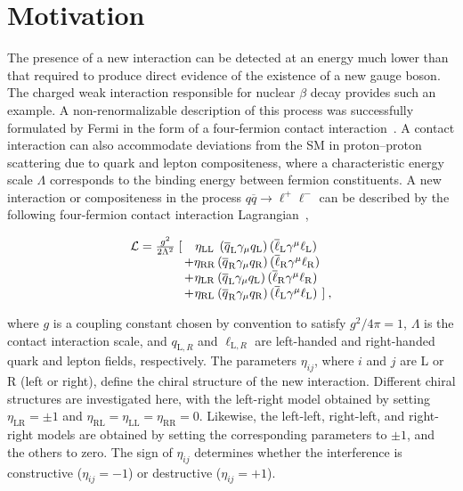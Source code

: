 \section{Motivation}\label{sec:ciMotivation}

The presence of a new interaction can be detected at an energy much lower than that required to produce direct evidence of the existence of a new gauge boson. The charged weak interaction responsible for nuclear $\beta$ decay provides such an example. A non-renormalizable description of this process was successfully formulated by Fermi in the form of a four-fermion contact interaction~\cite{Fermi:1934hr}. A contact interaction can also accommodate deviations from the SM in proton--proton scattering due to quark and lepton compositeness, where a characteristic energy scale $\Lambda$ corresponds to the binding energy between fermion constituents. A new interaction or compositeness in the process $q\overline{q} \to \ell^+\ell^-$ can be described by the following four-fermion contact interaction Lagrangian~\cite{eichten, Eichten:1984eu},

\begin{equation}\label{eqn:ciLagrangian}
\begin{array}{r@{\,}c@{}c@{\,}l@{\,}l}
\mathcal L = \frac{g^2}{2\Lambda^2}\;[ && \eta_{\mathrm{LL}}&\, (\overline q_{\mathrm L}\gamma_{\mu} q_{\mathrm L})\,(\overline\ell_{\mathrm L}\gamma^{\mu}\ell_{\mathrm L}) \nonumber \\
& +&\eta_{\mathrm{RR}}& (\overline q_{\mathrm R}\gamma_{\mu} q_{\mathrm R}) \,(\overline\ell_{\mathrm R}\gamma^{\mu}\ell_{\mathrm R}) \\
&+&\eta_{\mathrm{LR}}& (\overline q_{\mathrm L}\gamma_{\mu} q_{\mathrm L}) \,(\overline\ell_{\mathrm R}\gamma^{\mu}\ell_{\mathrm R}) \\
&+&\eta_{\mathrm{RL}}& (\overline q_{\mathrm R}\gamma_{\mu} q_{\mathrm R}) \,(\overline\ell_{\mathrm L}\gamma^{\mu}\ell_{\mathrm L})& ] \: ,\nonumber
\end{array}
\end{equation}

\noindent where $g$ is a coupling constant chosen by convention to satisfy $g^2/4\pi = 1$, $\Lambda$ is the contact interaction scale, and $q_{\mathrm L,R}$ and $\ell_{\mathrm L,R}$ are left-handed and right-handed quark and lepton fields, respectively. The parameters $\eta_{ij}$, where $i$ and $j$ are L or R (left or right),  define the chiral structure of the new interaction. Different chiral structures are investigated here, with the left-right model obtained by setting $\eta_{\mathrm{LR}} = \pm 1$ and $\eta_{\mathrm{RL}} = \eta_{\mathrm{LL}} = \eta_{\mathrm{RR}} = 0$. Likewise, the left-left, right-left, and right-right models are obtained by setting the corresponding parameters to $\pm 1$, and the others to zero. The sign of $\eta_{ij}$ determines whether the interference is constructive ($\eta_{ij} = -1$) or destructive ($\eta_{ij} = +1$). 

